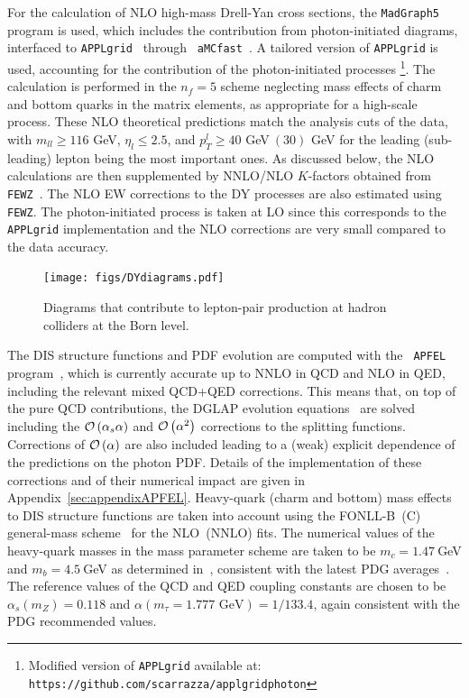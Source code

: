 For the calculation of NLO high-mass Drell-Yan cross sections, the
{\tt MadGraph5}~\cite{Alwall:2014hca} program is used, which
includes the contribution from photon-initiated diagrams, interfaced
to {\tt APPLgrid}~\cite{Carli:2010rw} through {\tt
  aMCfast}~\cite{amcfast}.
%
A tailored version of {\tt APPLgrid} is used, accounting for
the contribution of the photon-initiated processes \footnote{Modified version of {\tt APPLgrid} available at: {\tt https://github.com/scarrazza/applgridphoton}}.
%
The calculation is performed in the $n_f=5$ scheme neglecting mass
effects of charm and bottom quarks in the matrix elements, as
appropriate for a high-scale process.
%
These NLO theoretical predictions match the  
analysis cuts of the data, with $m_{ll}\ge 116$ GeV, $\eta_l\le 2.5$, and
$p_T^l \ge 40$ GeV$~(30)$ GeV for the leading (sub-leading) lepton being
the most important ones.
%
As discussed below, the NLO calculations are then supplemented by
NNLO/NLO $K$-factors obtained from {\tt FEWZ}~\cite{Gavin:2012sy}.
%
The NLO EW corrections to the DY processes are also estimated
using {\tt FEWZ}. 
%
The photon-initiated process is taken at LO since this corresponds to
the {\tt APPLgrid} implementation and the NLO corrections are
very small compared to the data accuracy.
%

\begin{figure}[t]
  \begin{center}
    \texttt{[image: figs/DYdiagrams.pdf]}
    \end{center}
    \caption{Diagrams that contribute to lepton-pair production at
      hadron colliders at the Born level.}
\label{fig:photoninduced}
\end{figure}

The DIS structure functions and PDF evolution are computed with the {\tt
  APFEL} program~\cite{Bertone:2013vaa}, which is currently accurate
up to NNLO in QCD and NLO in QED, including the relevant mixed
QCD+QED corrections.
%
This means that, on top of the pure QCD
contributions, the DGLAP evolution
equations~\cite{Gribov:1972ri,Dokshitzer:1977,Altarelli:1977zs} are
solved including the $\mathcal{O}\left( \alpha_s\alpha\right)$ and
$\mathcal{O}\left( \alpha^2\right)$ corrections to the splitting functions.
%
Corrections of $\mathcal{O}\left( \alpha\right)$ are also included leading to a (weak)
explicit dependence of the predictions on the photon PDF.
%
Details
of the implementation of these corrections and of their numerical
impact are given in Appendix~\ref{sec:appendixAPFEL}.
%
Heavy-quark (charm and bottom) mass effects to DIS structure functions
are taken into account using the FONLL-B~(C) general-mass
scheme~\cite{Forte:2010ta} for the NLO~(NNLO) fits.
%
The numerical values of the heavy-quark masses in the mass parameter 
scheme
are taken to be $m_c=1.47~$GeV and $m_b=4.5~$GeV as determined in~\cite{Abramowicz:2015mha},  
consistent with the latest PDG averages~\cite{Agashe:2014kda}.
%
The reference values of the QCD and QED coupling constants are chosen to be
$\alpha_s(m_Z)=0.118$ and $\alpha(m_\tau=1.777\mbox{ GeV})=1/133.4$, again consistent
with the PDG recommended values.

